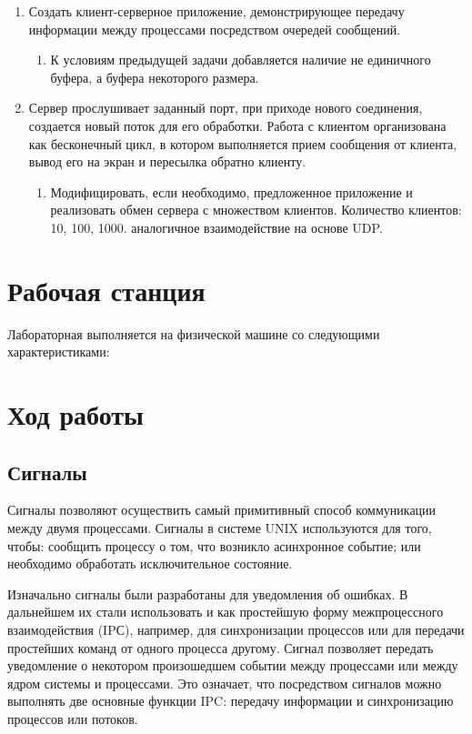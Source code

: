 \documentclass[a4paper]{article}
\begin{document}
\begin{enumerate}
\item Создать клиент-серверное приложение, демонстрирующее передачу информации между процессами посредством очередей сообщений.
	\begin{enumerate} \item К условиям предыдущей задачи добавляется наличие не единичного буфера, а буфера некоторого размера.
	\end{enumerate}
\item Сервер прослушивает заданный порт, при приходе нового соединения, создается новый поток для его обработки. Работа с клиентом организована как бесконечный цикл, в котором выполняется прием сообщения от клиента, вывод его на экран и пересылка обратно клиенту.
	\begin{enumerate} \item Модифицировать, если необходимо, предложенное приложение и реализовать обмен сервера с множеством клиентов. Количество клиентов: 10, 100, 1000.
		 аналогичное взаимодействие на основе UDP.
	\end{enumerate}
\end{enumerate}
\section{Рабочая станция}
	Лабораторная выполняется на физической машине со следующими характеристиками:
	
	
\section{Ход работы}

\subsection{Сигналы}
	Сигналы позволяют осуществить самый примитивный способ коммуникации между двумя процессами. Сигналы в системе UNIX используются для того, чтобы: сообщить процессу о том, что возникло асинхронное событие; или необходимо обработать исключительное состояние.
	
	Изначально сигналы были разработаны для уведомления об ошибках. В дальнейшем их стали использовать и как простейшую форму межпроцессного взаимодействия (IPС), например, для синхронизации процессов или для передачи простейших команд от одного процесса другому. Сигнал позволяет передать уведомление о некотором произошедшем событии между процессами или между ядром системы и процессами. Это означает, что посредством сигналов можно выполнять две основные функции IPC: передачу информации и синхронизацию процессов или потоков.
	
\end{document}
